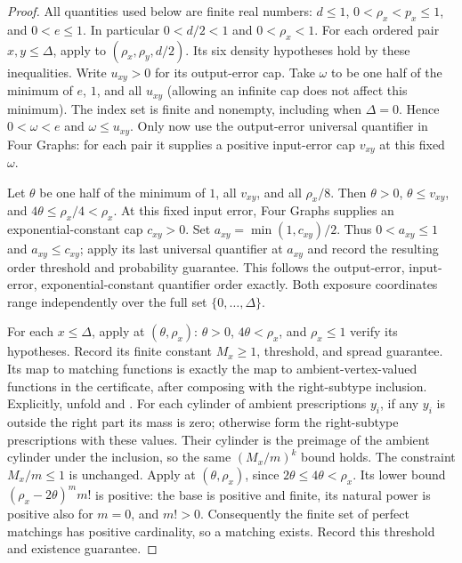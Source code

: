 \begin{proof}
All quantities used below are finite real numbers: $d\leq1$,
$0<\rho_x<p_x\leq1$, and $0<e\leq1$.
In particular $0<d/2<1$ and $0<\rho_x<1$.
For each ordered pair $x,y\leq\Delta$, apply
 to $(\rho_x,\rho_y,d/2)$.
Its six density hypotheses hold by these inequalities. Write $u_{xy}>0$
for its output-error cap. Take $\omega$ to be one half of the minimum
of $e$, $1$, and all $u_{xy}$ (allowing an infinite cap does not affect
this minimum). The index set is finite and nonempty, including when
$\Delta=0$. Hence $0<\omega<e$ and $\omega\leq u_{xy}$.
Only now use the output-error universal quantifier in Four Graphs:
for each pair it supplies a positive input-error cap $v_{xy}$ at
this fixed $\omega$.

Let $\theta$ be one half of the minimum of $1$, all $v_{xy}$,
and all $\rho_x/8$. Then $\theta>0$, $\theta\leq v_{xy}$, and
$4\theta\leq\rho_x/4<\rho_x$.
At this fixed input error, Four Graphs supplies an exponential-constant
cap $c_{xy}>0$. Set $a_{xy}=\min(1,c_{xy})/2$.
Thus $0<a_{xy}\leq1$ and $a_{xy}\leq c_{xy}$; apply its last
universal quantifier at $a_{xy}$ and record the resulting order threshold
and probability guarantee. This follows the output-error, input-error,
exponential-constant quantifier order exactly. Both exposure coordinates
range independently over the full set $\{0,\ldots,\Delta\}$.

For each $x\leq\Delta$, apply 
at $(\theta,\rho_x)$: $\theta>0$, $4\theta<\rho_x$, and
$\rho_x\leq1$ verify its hypotheses. Record its finite constant
$M_x\geq1$, threshold, and spread guarantee. Its map to matching
functions is exactly the map to ambient-vertex-valued functions in the
certificate, after composing with the right-subtype inclusion.
Explicitly, unfold  and .
For each cylinder of ambient prescriptions $y_i$, if any
$y_i$ is outside the right part its mass is zero; otherwise form the
right-subtype prescriptions with these values. Their cylinder is the
preimage of the ambient cylinder under the inclusion, so the same
$(M_x/m)^k$ bound holds. The constraint $M_x/m\leq1$ is unchanged.
Apply  at $(\theta,\rho_x)$, since
$2\theta\leq4\theta<\rho_x$. Its lower bound
$(\rho_x-2\theta)^m m!$ is positive: the base is positive and finite,
its natural power is positive also for $m=0$, and $m!>0$.
Consequently the finite set of perfect matchings has positive cardinality,
so a matching exists. Record this threshold and existence guarantee.


\end{proof}
